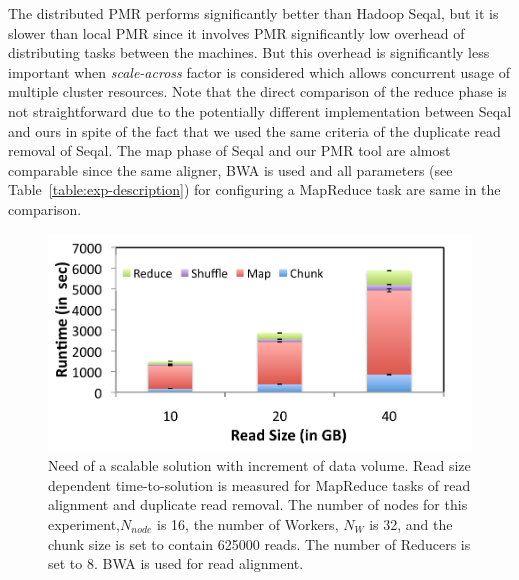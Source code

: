 \documentclass{acm_proc_article-sp}
\begin{document}
The distributed PMR performs
significantly better than Hadoop Seqal, but it is slower than local
PMR since it involves PMR significantly low overhead of distributing
tasks between the machines.  But this overhead is significantly less
important when \textit{scale-across} factor is considered which allows
concurrent usage of multiple cluster resources. Note that the direct
comparison of the reduce phase is not straightforward due to the
potentially different implementation between Seqal and ours in spite
of the fact that we used the same criteria of the duplicate read
removal of Seqal\cite{seal_2011_mapred}. The map phase of Seqal and
our PMR tool are almost comparable since the same aligner, BWA is used
and all parameters (see Table~\ref{table:exp-description}) for
configuring a MapReduce task are same in the comparison.



 \begin{figure}
 \centering
\includegraphics[scale=0.50]{figures/pj-smr-tts.pdf} 
\caption{\small Need of a scalable solution with increment of data volume.  Read size dependent time-to-solution is measured for MapReduce tasks of read alignment and duplicate read removal.  The number of nodes for this experiment,$N_{node}$ is 16, the number of Workers, $N_W$ is 32, and the chunk size is set to contain 625000 reads.  The number of Reducers is set to 8. BWA is used for read alignment.}
  \label{fig:read-size} 
\end{figure}
\end{document}
